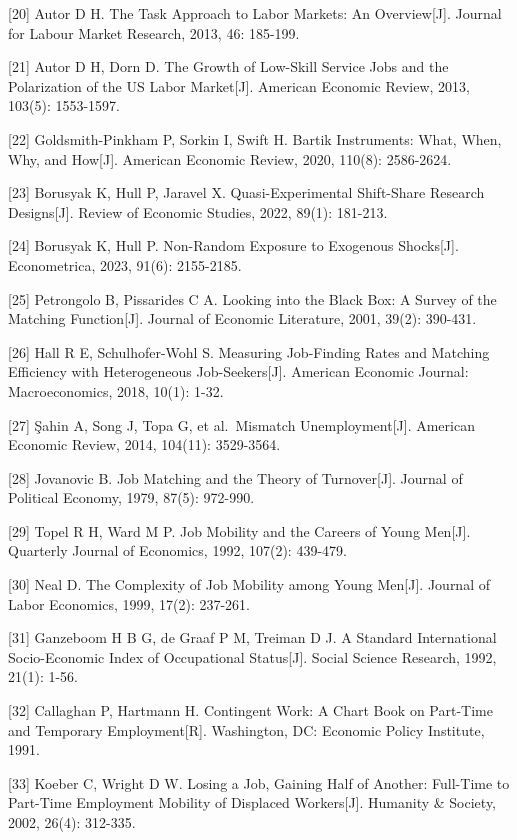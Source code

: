 \documentclass[UTF8, zihao=-4, a4paper, openany, fontset=none]{ctexrep}
\numberwithin{equation}{chapter}
\begin{document}
{[}20{]} Autor D H. The Task Approach to Labor Markets: An Overview{[}J{]}. Journal for Labour Market Research, 2013, 46: 185-199.

{[}21{]} Autor D H, Dorn D. The Growth of Low-Skill Service Jobs and the Polarization of the US Labor Market{[}J{]}. American Economic Review, 2013, 103(5): 1553-1597.

{[}22{]} Goldsmith-Pinkham P, Sorkin I, Swift H. Bartik Instruments: What, When, Why, and How{[}J{]}. American Economic Review, 2020, 110(8): 2586-2624.

{[}23{]} Borusyak K, Hull P, Jaravel X. Quasi-Experimental Shift-Share Research Designs{[}J{]}. Review of Economic Studies, 2022, 89(1): 181-213.

{[}24{]} Borusyak K, Hull P. Non-Random Exposure to Exogenous Shocks{[}J{]}. Econometrica, 2023, 91(6): 2155-2185.

{[}25{]} Petrongolo B, Pissarides C A. Looking into the Black Box: A Survey of the Matching Function{[}J{]}. Journal of Economic Literature, 2001, 39(2): 390-431.

{[}26{]} Hall R E, Schulhofer-Wohl S. Measuring Job-Finding Rates and Matching Efficiency with Heterogeneous Job-Seekers{[}J{]}. American Economic Journal: Macroeconomics, 2018, 10(1): 1-32.

{[}27{]} Şahin A, Song J, Topa G, et al.~Mismatch Unemployment{[}J{]}. American Economic Review, 2014, 104(11): 3529-3564.

{[}28{]} Jovanovic B. Job Matching and the Theory of Turnover{[}J{]}. Journal of Political Economy, 1979, 87(5): 972-990.

{[}29{]} Topel R H, Ward M P. Job Mobility and the Careers of Young Men{[}J{]}. Quarterly Journal of Economics, 1992, 107(2): 439-479.

{[}30{]} Neal D. The Complexity of Job Mobility among Young Men{[}J{]}. Journal of Labor Economics, 1999, 17(2): 237-261.

{[}31{]} Ganzeboom H B G, de Graaf P M, Treiman D J. A Standard International Socio-Economic Index of Occupational Status{[}J{]}. Social Science Research, 1992, 21(1): 1-56.

{[}32{]} Callaghan P, Hartmann H. Contingent Work: A Chart Book on Part-Time and Temporary Employment{[}R{]}. Washington, DC: Economic Policy Institute, 1991.

{[}33{]} Koeber C, Wright D W. Losing a Job, Gaining Half of Another: Full-Time to Part-Time Employment Mobility of Displaced Workers{[}J{]}. Humanity \& Society, 2002, 26(4): 312-335.
\end{document}
